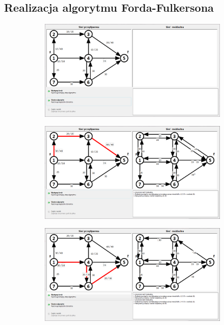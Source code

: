 \documentclass[a4paper]{book}
\begin{document}
\begin{appendices}
 	\chapter{Realizacja algorytmu Forda-Fulkersona}\label{add:C}
 	\setlength\intextsep{10pt}
 	\begin{figure}[H]
 		\centering
 		\begin{subfigure}{\textwidth}
 			\includegraphics[width=0.9\linewidth]{./img/spec_zew06_1.png}
 		\end{subfigure}\par\bigskip
 		\begin{subfigure}{\textwidth}
 			\includegraphics[width=0.9\linewidth]{./img/spec_zew06_2.png}
 		\end{subfigure}
 	\end{figure}
 	\begin{figure}[H]
 		\ContinuedFloat
 		\begin{subfigure}{\textwidth}
 			\includegraphics[width=0.9\linewidth]{./img/spec_zew06_3.png}

\end{subfigure}
\end{figure}
\end{appendices}
\end{document}
